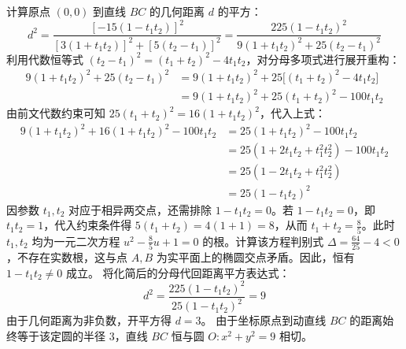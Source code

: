 \begin{solution}
计算原点 $(0,0)$ 到直线 $BC$ 的几何距离 $d$ 的平方：
\[ d^2 = \frac{[-15(1 - t_1 t_2)]^2}{[3(1 + t_1 t_2)]^2 + [5(t_2 - t_1)]^2} = \frac{225(1 - t_1 t_2)^2}{9(1 + t_1 t_2)^2 + 25(t_2 - t_1)^2} \]
利用代数恒等式 $(t_2 - t_1)^2 = (t_1 + t_2)^2 - 4t_1 t_2$，对分母多项式进行展开重构：
\begin{align*}
9(1 + t_1 t_2)^2 + 25(t_2 - t_1)^2 &= 9(1 + t_1 t_2)^2 + 25\big[ (t_1 + t_2)^2 - 4t_1 t_2 \big] \\
&= 9(1 + t_1 t_2)^2 + 25(t_1 + t_2)^2 - 100t_1 t_2
\end{align*}
由前文代数约束可知 $25(t_1 + t_2)^2 = 16(1 + t_1 t_2)^2$，代入上式：
\begin{align*}
9(1 + t_1 t_2)^2 + 16(1 + t_1 t_2)^2 - 100t_1 t_2 &= 25(1 + t_1 t_2)^2 - 100t_1 t_2 \\
&= 25(1 + 2t_1 t_2 + t_1^2 t_2^2) - 100t_1 t_2 \\
&= 25(1 - 2t_1 t_2 + t_1^2 t_2^2) \\
&= 25(1 - t_1 t_2)^2
\end{align*}
因参数 $t_1, t_2$ 对应于相异两交点，还需排除 $1 - t_1 t_2 = 0$。若 $1 - t_1 t_2 = 0$，即 $t_1 t_2 = 1$，代入约束条件得 $5(t_1 + t_2) = 4(1+1) = 8$，从而 $t_1 + t_2 = \frac{8}{5}$。此时 $t_1, t_2$ 均为一元二次方程 $u^2 - \frac{8}{5}u + 1 = 0$ 的根。计算该方程判别式 $\Delta = \frac{64}{25} - 4 < 0$，不存在实数根，这与点 $A, B$ 为实平面上的椭圆交点矛盾。因此，恒有 $1 - t_1 t_2 \neq 0$ 成立。
将化简后的分母代回距离平方表达式：
\[ d^2 = \frac{225(1 - t_1 t_2)^2}{25(1 - t_1 t_2)^2} = 9 \]
由于几何距离为非负数，开平方得 $d = 3$。
由于坐标原点到动直线 $BC$ 的距离始终等于该定圆的半径 $3$，直线 $BC$ 恒与圆 $O: x^2 + y^2 = 9$ 相切。
\end{solution}


